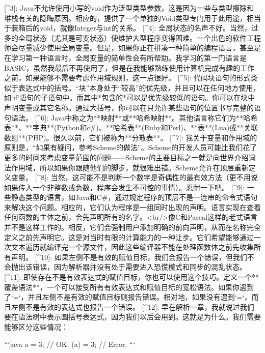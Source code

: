 \documentclass[cn,11pt,chinese]{elegantbook}
\begin{document}
{[^3]: Java不允许使用小写的void作为泛型类型参数，这是因为一些与类型擦除和堆栈有关的隐晦原因。相应的，提供了一个单独的Void类型专门用于此用途，相当于装箱后的void，就像Integer与int的关系。
[^4]: 全局状态的名声不好。当然，过多的全局状态（尤其是可变状态）使维护大型程序变得困难。一个出色的软件工程师会尽量减少使用全局变量。但是，如果你正在拼凑一种简单的编程语言，甚至是在学习第一种语言时，全局变量的简单性会有所帮助。我学习的第一门语言是BASIC，虽然我最后不再使用了，但是在我能够熟练使用计算机完成有趣的工作之前，如果能够不需要考虑作用域规则，这一点很好。
[^5]: 代码块语句的形式类似于表达式中的括号。“块”本身处于“较高”的优先级，并且可以在任何地方使用，如`if`语句的子语句中。而其中*包含的*可以是优先级较低的语句。你可以在块中声明变量或其它名称。通过大括号，你可以在只允许某些语句的位置书写完整的语句语法。
[^6]: Java中称之为**映射**或**哈希映射**。其他语言称它们为**哈希表**、**字典**(Python和c#)、**哈希表**(Ruby和Perl)、**表**(Lua)或**关联数组**(PHP)。很久以前，它们被称为**分散表**。
[^7]: 我关于变量和作用域的原则是，“如果有疑问，参考Scheme的做法”。Scheme的开发人员可能比我们花了更多的时间来考虑变量范围的问题——Scheme的主要目标之一就是向世界介绍词法作用域，所以如果你跟随他们的脚步，就很难出错。Scheme允许在顶层重新定义变量。
[^8]: 当然，这可能不是判断一个数字是奇偶性的最有效方法（更不用说如果传入一个非整数或负数，程序会发生不可控的事情）。忍耐一下吧。
[^9]: 一些静态类型的语言，如Java和C#，通过规定程序的顶层不是一连串的命令式语句来解决这个问题。相应的，它们认为程序是一组同时出现的声明。语言实现在查看任何函数的主体之前，会先声明所有的名字。<br/>像C和Pascal这样的老式语言并不是这样工作的。相反，它们会强制用户添加明确的前向声明，从而在名称完全定义之前先声明它。这是对当时有限的计算能力的一种让步。它们希望能够通过一次文本遍历就编译完一个源文件，因此这些编译器不能在处理函数体之前先收集所有声明。
[^10]: 如果左侧不是有效的赋值目标，我们会报告一个错误，但我们不会抛出该错误，因为解析器并没有处于需要进入恐慌模式和同步的混乱状态。
[^11]: 即使存在不是有效表达式的赋值目标，你也可以使用这个技巧。定义一个**覆盖语法**，一个可以接受所有有效表达式和赋值目标的宽松语法。如果你遇到了`=`，并且左侧不是有效的赋值目标则报告错误。相对地，如果没有遇到`=`，而且左侧不是有效的表达式也报告一个错误。
[^12]: 早在解析一章，我就说过我们要在语法树中表示圆括号表达式，因为我们以后会用到。这就是为什么。我们需要能够区分这些情况：

```java
a = 3;   // OK.
(a) = 3; // Error.
```

}
\end{document}

